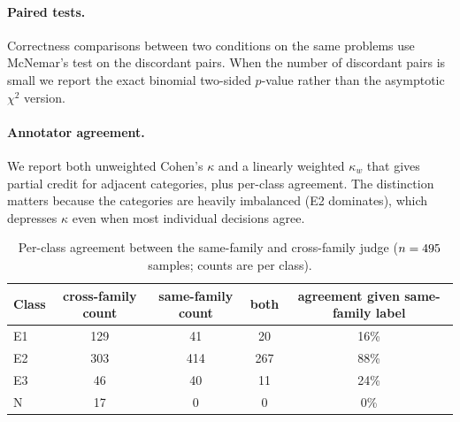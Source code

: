 \paragraph{Paired tests.}
Correctness comparisons between two conditions on the same problems use McNemar's test
\citep{mcnemar1947} on the discordant pairs. When the number of discordant pairs is
small we report the exact binomial two-sided $p$-value rather than the asymptotic
$\chi^2$ version.

\paragraph{Annotator agreement.}
We report both unweighted Cohen's $\kappa$ and a linearly weighted $\kappa_w$
\citep{landis1977kappa} that gives partial credit for adjacent categories, plus
per-class agreement. The distinction matters because the categories are heavily
imbalanced (E2 dominates), which depresses $\kappa$ even when most individual
decisions agree.

\begin{table}[h]
  \centering
  \caption{Per-class agreement between the same-family and cross-family judge
           ($n=495$ samples; counts are per class).}
  \label{tab:perclass}
  \small
  \begin{tabular}{@{}l c c c c@{}}
    \toprule
    \textbf{Class} & \textbf{cross-family count} & \textbf{same-family count} &
      \textbf{both} & \textbf{agreement given same-family label} \\
    \midrule
    E1 & 129 & 41 & 20 & 16\% \\
    E2 & 303 & 414 & 267 & 88\% \\
    E3 & 46 & 40 & 11 & 24\% \\
    N & 17 & 0 & 0 & 0\% \\
    \bottomrule
  \end{tabular}
\end{table}
